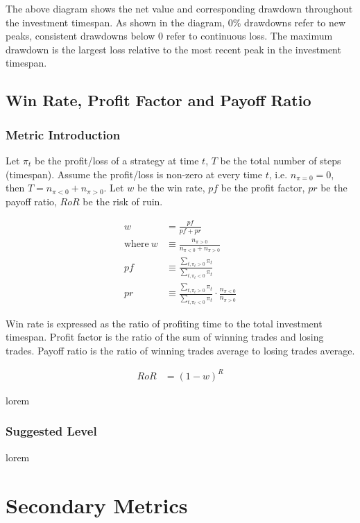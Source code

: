 \documentclass[12pt]{article}
\begin{document}
The above diagram shows the net value and corresponding drawdown throughout the investment timespan. As shown in the diagram, \(0\%\) drawdowns refer to new peaks, consistent drawdowns below 0 refer to continuous loss. The maximum drawdown is the largest loss relative to the most recent peak in the investment timespan.

\subsection{Win Rate, Profit Factor and Payoff Ratio}

\subsubsection*{Metric Introduction}

Let \(\pi_t\) be the profit/loss of a strategy at time \(t\), \(T\) be the total number of steps (timespan). Assume the profit/loss is non-zero at every time \(t\), i.e. \(n_{\pi=0} = 0\), then \(T = n_{\pi<0} + n_{\pi>0}\). Let \(w\) be the win rate, \(pf\) be the profit factor, \(pr\) be the payoff ratio, \(RoR\) be the risk of ruin.

\begin{align*}
  w &= \frac{pf}{pf+pr} \\
  \text{where}~w &\equiv \frac{n_{\pi>0}}{n_{\pi<0} + n_{\pi>0}} \\
  pf &\equiv \frac{\sum_{t, \pi_t>0} \pi_t}{\sum_{t, \pi_t<0} \pi_t} \\
  pr &\equiv \frac{\sum_{t, \pi_t>0} \pi_t}{\sum_{t, \pi_t<0} \pi_t} \cdot \frac{n_{\pi<0}}{n_{\pi>0}}
\end{align*}

Win rate is expressed as the ratio of profiting time to the total investment timespan. Profit factor is the ratio of the sum of winning trades and losing trades. Payoff ratio is the ratio of winning trades average to losing trades average.

\begin{align*}
  RoR &= (1-w)^R
\end{align*}

lorem

\subsubsection*{Suggested Level}

lorem

\section{Secondary Metrics}
\end{document}
